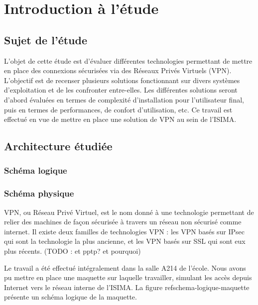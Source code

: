 \section{Introduction à l'étude}
\subsection{Sujet de l'étude}
L'objet de cette étude est d'évaluer différentes technologies permettant de mettre en place des connexions sécurisées via des Réseaux Privés Virtuels (VPN). L'objectif est de recenser plusieurs solutions fonctionnant sur divers systèmes d'exploitation et de les confronter entre-elles. Les différentes solutions seront d'abord évaluées en termes de complexité d'installation pour l'utilisateur final, puis en termes de performances, de confort d'utilisation, etc. Ce travail est effectué en vue de mettre en place une solution de VPN au sein de l'ISIMA.

\subsection{Architecture étudiée}
\subsubsection{Schéma logique}
\subsubsection{Schéma physique}


VPN, ou Réseau Privé Virtuel, est le nom donné à une technologie permettant de relier des machines de façon sécurisée à travers un réseau non sécurisé comme internet. Il existe deux familles de technologies VPN : les VPN basés sur IPsec qui sont la technologie la plus ancienne, et les VPN basés sur SSL qui sont eux plus récents. (TODO : et pptp? et pourquoi)

Le travail a été effectué intégralement dans la salle A214 de l'école. Nous avons pu mettre en place une maquette sur laquelle travailler, simulant les accès depuis Internet vers le réseau interne de l'ISIMA. La figure ref{schema-logique-maquette} présente un schéma logique de la maquette.

